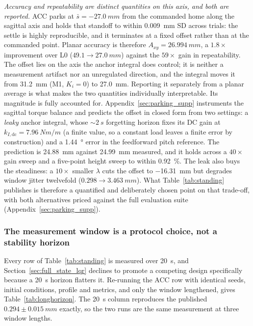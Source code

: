 \documentclass[a4paper,fleqn]{cas-dc}
\begin{document}
\emph{Accuracy and repeatability are distinct quantities on this axis, and both
are reported.} ACC parks at $\bar{s}={-}\SI{27.0}{mm}$ from the commanded home
along the sagittal axis and holds that standoff to within \SI{0.009}{mm} SD
across trials: the settle is highly reproducible, and it terminates at a fixed
offset rather than at the commanded point. Planar accuracy is therefore
$A_{xy}=\SI{26.994}{mm}$, a $1.8{\times}$ improvement over L0
($49.1\rightarrow\SI{27.0}{mm}$) against the $59{\times}$ gain in repeatability.
The offset lies on the axis the anchor integral does control; it is neither a measurement artifact nor an unregulated direction, and the integral moves it
from \SI{31.2}{mm} (M1, $K_i{=}0$) to \SI{27.0}{mm}. Reporting it separately
from a planar average is what makes the two quantities individually
interpretable.
Its magnitude is fully accounted for. Appendix~\ref{sec:parking_supp}
instruments the sagittal torque balance and predicts the offset in closed form
from two settings: a \emph{leaky} anchor integral, whose ${\sim}\SI{2}{s}$
forgetting horizon fixes its DC gain at
$k_{I,\text{dc}}{=}\SI{7.96}{Nm/m}$ (a finite value, so a constant load leaves
a finite error by construction) and a \SI{1.44}{\degree} error in the
feedforward pitch reference. The prediction is \SI{24.88}{mm} against
\SI{24.99}{mm} measured, and it holds across a $40{\times}$ gain sweep and a
five-point height sweep to within \SI{0.92}{\percent}. The leak also buys the
steadiness: a $10{\times}$ smaller $\lambda$ cuts the offset to \SI{-16.31}{mm}
but degrades window jitter twelvefold ($0.298\rightarrow\SI{3.463}{mm}$). What
Table~\ref{tab:standing} publishes is therefore a quantified and deliberately
chosen point on that trade-off, with both alternatives priced against the full
evaluation suite (Appendix~\ref{sec:parking_supp}).

\subsubsection{The measurement window is a protocol choice, not a stability horizon}
\label{sec:longhorizon}

Every row of Table~\ref{tab:standing} is measured over \SI{20}{s}, and
Section~\ref{sec:full_state_lqr} declines to promote a competing design
specifically because a \SI{20}{s} horizon flatters it. Re-running the ACC row with identical seeds, initial conditions, profile and metrics, and only the window lengthened, gives Table~\ref{tab:longhorizon}. The \SI{20}{s} column reproduces
the published $0.294{\pm}\SI{0.015}{mm}$ exactly, so the two runs are the same
measurement at three window lengths.
\end{document}
